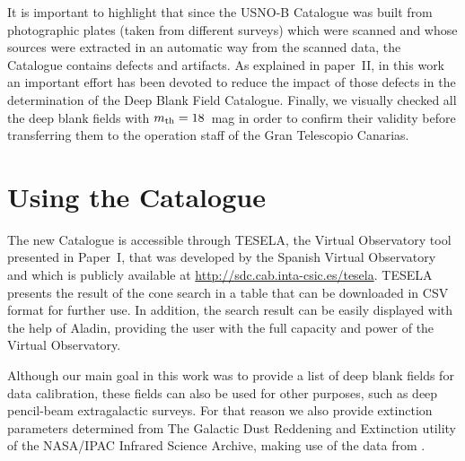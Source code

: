 It is important to highlight that since the USNO-B Catalogue was built from photographic plates (taken from different surveys) which were scanned and whose sources were extracted in an automatic way from the scanned data, the Catalogue contains defects and artifacts. As explained in paper~II, in this work an important effort has been devoted to reduce the impact of those defects in the determination of the Deep Blank Field Catalogue. Finally, we visually checked all the deep blank fields with $m_{\mbox{\scriptsize th}}=18$~mag in order to confirm their validity before transferring them to the operation staff of the Gran Telescopio Canarias.

\section{Using the Catalogue}

The new Catalogue is accessible through TESELA, the Virtual Observatory tool presented in Paper~I, that was developed by the Spanish Virtual Observatory and which is publicly available at\,\,\url{http://sdc.cab.inta-csic.es/tesela}. TESELA presents the result of the cone search in a table that can be downloaded in CSV format for further use. In addition, the search result can be easily displayed with the help of Aladin, providing the user with the full capacity and power of the Virtual Observatory.

Although our main goal in this work was to provide a list of deep blank fields for data calibration, these fields can also be used for other purposes, such as deep pencil-beam extragalactic surveys. For that reason we also provide extinction parameters determined from The Galactic Dust Reddening and Extinction utility of the NASA/IPAC Infrared Science Archive, making use of the data from \citet{1998ApJ...500..525S}.

